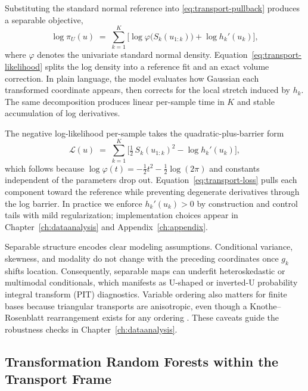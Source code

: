 \documentclass[11pt,a4paper,twoside]{book}\usepackage[]{graphicx}\usepackage[]{xcolor}
\begin{document}
Substituting the standard normal reference into \eqref{eq:transport-pullback} produces a separable objective,
\begin{equation}
  \log \pi_U(u) \;=\; \sum_{k=1}^{K}\Big[\log \varphi\!\big(S_k(u_{1:k})\big) + \log h_k'(u_k)\Big],\label{eq:transport-likelihood}
\end{equation}
where $\varphi$ denotes the univariate standard normal density. Equation~\eqref{eq:transport-likelihood} splits the log density into a reference fit and an exact volume correction. In plain language, the model evaluates how Gaussian each transformed coordinate appears, then corrects for the local stretch induced by $h_k$. The same decomposition produces linear per-sample time in $K$ and stable accumulation of log derivatives.

The negative log-likelihood per-sample takes the quadratic-plus-barrier form
\begin{equation}
  \mathcal{L}(u) \;=\; \sum_{k=1}^{K}\Big[\tfrac{1}{2}\,S_k(u_{1:k})^2 - \log h_k'(u_k)\Big],\label{eq:transport-loss}
\end{equation}
which follows because $\log \varphi(t) = -\tfrac{1}{2}t^2 - \tfrac{1}{2}\log(2\pi)$ and constants independent of the parameters drop out. Equation~\eqref{eq:transport-loss} pulls each component toward the reference while preventing degenerate derivatives through the log barrier. In practice we enforce $h_k'(u_k)>0$ by construction and control tails with mild regularization; implementation choices appear in Chapter~\ref{ch:dataanalysis} and Appendix~\ref{ch:appendix}.

Separable structure encodes clear modeling assumptions. Conditional variance, skewness, and modality do not change with the preceding coordinates once $g_k$ shifts location. Consequently, separable maps can underfit heteroskedastic or multimodal conditionals, which manifests as U-shaped or inverted-U probability integral transform (PIT) diagnostics. Variable ordering also matters for finite bases because triangular transports are anisotropic, even though a Knothe--Rosenblatt rearrangement exists for any ordering \citep{rosenblatt1952remarks,knothe1957contributions}. These caveats guide the robustness checks in Chapter~\ref{ch:dataanalysis}.

\subsection{Transformation Random Forests within the Transport Frame}\label{sec:transport-trtf}
\end{document}
